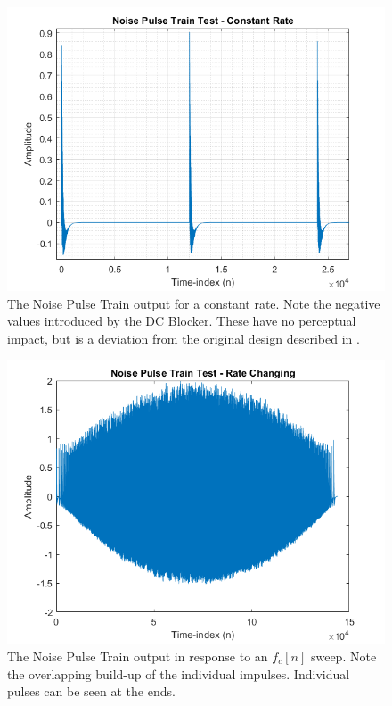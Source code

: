 \documentclass[../main.tex]{subfiles}
\begin{document}
\begin{figure}[h!]
    \centering
    \includegraphics[scale=.65]{./images/plots/NPTTest1.png}
    \caption{The Noise Pulse Train output for a constant rate. Note the negative values introduced by the DC Blocker. These have no perceptual impact, but is a deviation from the original design described in .}
    \label{fig:NPTT1}
\end{figure}

\clearpage

\begin{figure}[h!]
    \centering
    \includegraphics[scale=.60]{./images/plots/NPTTest2.png}
    \caption{The Noise Pulse Train output in response to an $f_c[n]$ sweep. Note the overlapping build-up of the individual impulses. Individual pulses can be seen at the ends.}
    \label{fig:NPTT2}
\end{figure}
\end{document}

